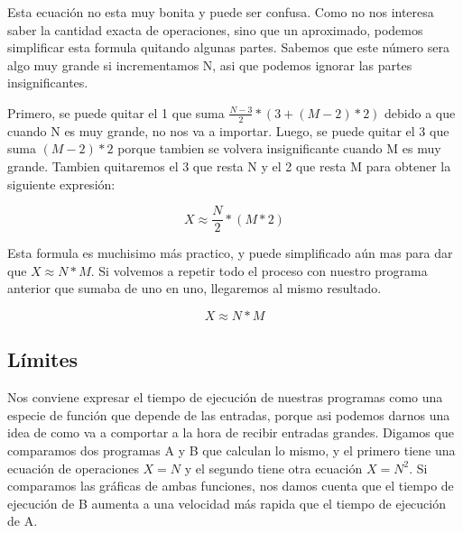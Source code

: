\documentclass{article}
\begin{document}
Esta ecuación no esta muy bonita y puede ser confusa. Como no nos interesa saber la cantidad exacta de operaciones, sino que un aproximado, podemos simplificar esta formula quitando algunas partes. Sabemos que este número sera algo muy grande si incrementamos N, asi que podemos ignorar las partes insignificantes.

Primero, se puede quitar el 1 que suma $\frac{N - 3}{2} * (3 + (M - 2) * 2)$ debido a que cuando N es muy grande, no nos va a importar. Luego, se puede quitar el 3 que suma $(M - 2) * 2$ porque tambien se volvera insignificante cuando M es muy grande. Tambien quitaremos el 3 que resta N y el 2 que resta M para obtener la siguiente expresión:

\begin{equation}
    X \approx \frac{N}{2} * (M * 2)
\end{equation}

Esta formula es muchisimo más practico, y puede simplificado aún mas para dar que $X \approx N * M$. Si volvemos a repetir todo el proceso con nuestro programa anterior que sumaba de uno en uno, llegaremos al mismo resultado.

\begin{equation}
    X \approx N * M
\end{equation}

\subsection{Límites}

Nos conviene expresar el tiempo de ejecución de nuestras programas como una especie de función que depende de las entradas, porque asi podemos darnos una idea de como va a comportar a la hora de recibir entradas grandes. Digamos que comparamos dos programas A y B que calculan lo mismo, y el primero tiene una ecuación de operaciones $X = N$ y el segundo tiene otra ecuación $X = N^2$. Si comparamos las gráficas de ambas funciones, nos damos cuenta que el tiempo de ejecución de B aumenta a una velocidad más rapida que el tiempo de ejecución de A.
\end{document}
